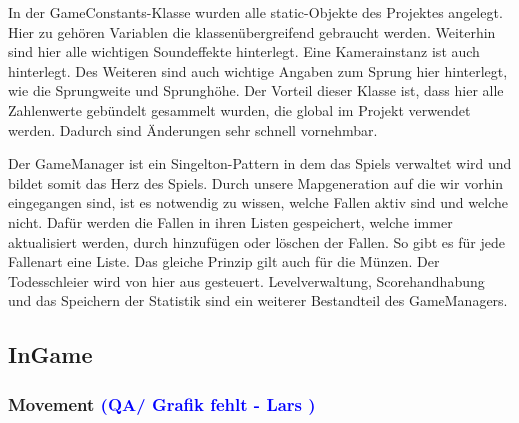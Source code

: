 \documentclass[12pt]{article}
\begin{document}
In der GameConstants-Klasse wurden alle static-Objekte des Projektes angelegt. Hier zu gehören Variablen die klassenübergreifend gebraucht werden.
Weiterhin sind hier alle wichtigen Soundeffekte hinterlegt. Eine Kamerainstanz ist auch hinterlegt. Des Weiteren sind auch wichtige Angaben zum Sprung
hier hinterlegt, wie die Sprungweite und Sprunghöhe. Der Vorteil dieser Klasse ist, dass hier alle Zahlenwerte gebündelt gesammelt wurden, die global im
Projekt verwendet werden. Dadurch sind Änderungen sehr schnell vornehmbar.

\noindent Der GameManager ist ein Singelton-Pattern in dem das Spiels verwaltet wird und bildet somit das Herz des Spiels. Durch unsere Mapgeneration auf die wir
vorhin eingegangen sind, ist es notwendig zu wissen, welche Fallen aktiv sind und welche nicht. Dafür werden die Fallen in ihren Listen gespeichert, welche
immer aktualisiert werden, durch hinzufügen oder löschen der Fallen. So gibt es für jede Fallenart eine Liste. Das gleiche Prinzip gilt auch für die Münzen.
Der Todesschleier wird von hier aus gesteuert. Levelverwaltung, Scorehandhabung und das Speichern der Statistik sind ein weiterer Bestandteil des GameManagers.

\vspace{2cm}
\subsection{InGame}

\vspace{1cm}
\subsubsection{Movement \textcolor{blue}{(QA/ Grafik fehlt - Lars )}}
\end{document}
